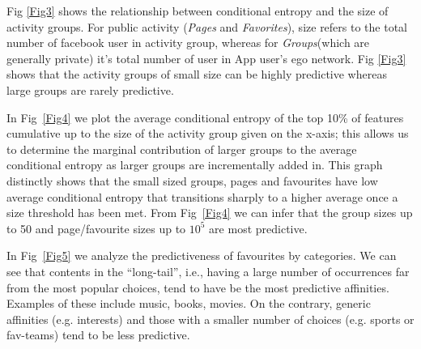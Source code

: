 




Fig \ref{Fig3} shows the relationship between conditional
    entropy and the size of activity groups. For public activity ({\em Pages} and 
    {\em Favorites}), size refers to the total number of facebook user in activity group, whereas
    for {\em Groups}(which are generally private) it's total number of user in App 
    user's ego network. Fig \ref{Fig3} shows that the activity groups of small 
    size can be highly predictive whereas large groups are rarely predictive.

In Fig~\ref{Fig4} we plot the average conditional entropy of the top
    10\% of features cumulative up to the size of the activity group given on the
    x-axis; this allows us to determine the marginal contribution of
    larger groups to the average conditional entropy as larger groups
    are incrementally added in.  This graph 
    distinctly shows that the small sized groups, pages and favourites
    have low average conditional entropy that transitions sharply to a
    higher average once a size threshold has been met. From 
    Fig~\ref{Fig4} we can infer that the group sizes up to 50 and
    page/favourite sizes up to $10^{5}$ are most predictive.
    
In Fig~\ref{Fig5}  we analyze the predictiveness of favourites by categories.
    We can see that contents in the ``long-tail'', i.e.,  
    having a large number of occurrences far from the most popular choices, 
    tend to have be the most predictive affinities. Examples of these include
    music, books, movies. On the contrary, generic affinities (e.g. interests) and 
    those with a smaller number of choices (e.g. sports or fav-teams) 
    tend to be less predictive. 



